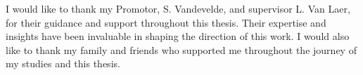 I would like to thank my Promotor, S. Vandevelde, and supervisor L. Van Laer, for their guidance and support throughout this thesis. Their expertise and insights have been invaluable in shaping the direction of this work. I would also like to thank my family and friends who supported me throughout the journey of my studies and this thesis.